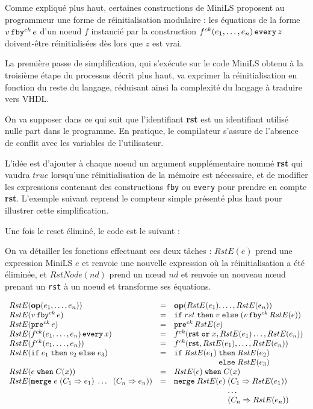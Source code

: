 \documentclass[a4paper]{article}
\newcommand{\mybox}[1]{\mbox{\tt{#1}}}
\newcommand{\Op}[2]{\mybox{\bf{op}}(#1,\dots,#2)}
\newcommand{\Fby}[2]{#1 \, \mybox{fby}^{ck} \, #2}
\newcommand{\Pre}[1]{\mybox{pre}^{ck} \, #1}
\newcommand{\Every}[4]{#1^{ck}(#2,\dots,#3) \, \mybox{every} \, #4}
\newcommand{\App}[2]{#1^{ck}(#2)}
\newcommand{\If}[3]{\mybox{if} \; #1 \; \mybox{then} \; #2 \; \mybox{else} \; #3}
\newcommand{\When}[3]{#1 \; \mybox{when} \; #2(#3)}
\newcommand{\Merge}[5]{\mybox{merge} \; #1 \; (#2 \Rightarrow #3) \; \dots \; \
  (#4 \Rightarrow #5)}
\begin{document}
Comme expliqué plus haut, certaines constructions de MiniLS proposent au
programmeur une forme de r\'einitialisation modulaire : les \'equations de la
forme $\Fby{v}{e}$ d'un noeud $f$ instanci\'e par la construction
$\Every{f}{e_1}{e_n}{z}$ doivent-\^etre r\'einitialis\'ees d\`es lors que $z$
est vrai.

La premi\`ere passe de simplification, qui s'ex\'ecute sur le code MiniLS obtenu
\`a la troisi\`eme \'etape du processus d\'ecrit plus haut, va exprimer la
réinitialisation en fonction du reste du langage, réduisant ainsi la complexité
du langage à traduire vers VHDL.

On va supposer dans ce qui suit que l'identifiant \textbf{rst} est un
identifiant utilisé nulle part dans le programme. En pratique, le compilateur
s'assure de l'absence de conflit avec les variables de l'utilisateur.

L'id\'ee est d'ajouter \`a chaque noeud un argument suppl\'ementaire nomm\'e
\textbf{rst} qui vaudra $true$ lorsqu'une r\'einitialisation de la m\'emoire est
nécessaire, et de modifier les expressions contenant des constructions
\texttt{fby} ou \texttt{every} pour prendre en compte \textbf{rst}. L'exemple
suivant reprend le compteur simple présenté plus haut pour illustrer cette
simplification.



Une fois le reset éliminé, le code est le suivant :



On va détailler les fonctions effectuant ces deux t\^aches : $RstE(e)$ prend une
expression MiniLS $e$ et renvoie une nouvelle expression où la réinitialisation
a été éliminée, et $RstNode(nd)$ prend un nœud $nd$ et renvoie un nouveau nœud
prenant un \texttt{rst} \`a un noeud et transforme ses \'equations.

\newcommand{\re}[1]{RstE(#1)}
\newcommand{\rstn}[1]{RstNode(#1)}

\[
\begin{array}{lcl}
  \re{\Op{e_1}{e_n}} & = & \Op{\re{e_1}}{\re{e_n}} \\
  \re{\Fby{v}{e}} & = & \If{rst}{v}{(\Fby{v}{\re{e}})} \\
  \re{\Pre{e}} & = & \Pre{\re{e}} \\
  \re{\Every{f}{e_1}{e_n}{x}} & = & \App{f}{\mathbf{rst} \; \mathtt{or} \;
    x, \re{e_1} \dots, \re{e_n}} \\
  \re{\App{f}{e_1,\dots,e_n}} & = &
  \App{f}{\mathbf{rst},\re{e_1},\dots,\re{e_n}} \\
  \re{\If{e_1}{e_2}{e_3}} & = & \If{\re{e_1}}{\re{e_2}\\ & & \hspace{1.9cm}}
  {\re{e_3}} \\
  \re{\When{e}{C}{x}} & = & \When{\re{e}}{C}{x} \\
  \re{\Merge{e}{C_1}{e_1}{C_n}{e_n}} & = &
  \mybox{merge} \; \re{e} \; (C_1 \Rightarrow \re{e_1}) \\
  & & \hspace{2.4cm} \dots \\
  & & \hspace{2.4cm} (C_n \Rightarrow \re{e_n})
\end{array}
\]
\end{document}
